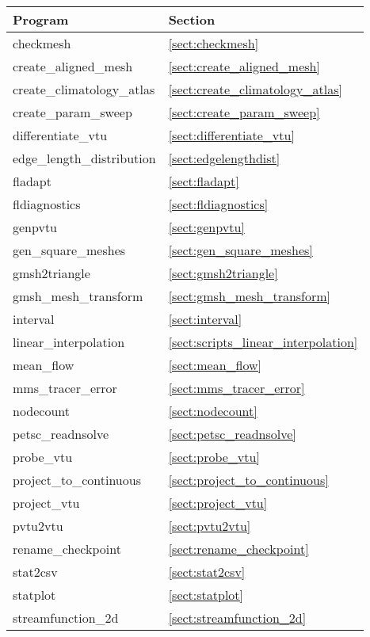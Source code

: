 \begin{table}
\begin{center}
  \begin{tabular}{| l | l |}
    \hline
	Program					& Section 				\\
    \hline
	checkmesh				& \ref{sect:checkmesh}			\\
	create\_aligned\_mesh 			& \ref{sect:create_aligned_mesh}	\\
	create\_climatology\_atlas		& \ref{sect:create_climatology_atlas}	\\
    create\_param\_sweep            & \ref{sect:create_param_sweep} \\
	differentiate\_vtu          		& \ref{sect:differentiate_vtu}		\\
	edge\_length\_distribution		& \ref{sect:edgelengthdist} 		\\
	fladapt					& \ref{sect:fladapt}			\\
	fldiagnostics				& \ref{sect:fldiagnostics}		\\
	genpvtu					& \ref{sect:genpvtu}			\\
	gen\_square\_meshes			& \ref{sect:gen_square_meshes} 		\\
	gmsh2triangle				& \ref{sect:gmsh2triangle}		\\
	gmsh\_mesh\_transform			& \ref{sect:gmsh_mesh_transform}	\\
	interval				& \ref{sect:interval} 			\\
	linear\_interpolation			& \ref{sect:scripts_linear_interpolation} \\	
	mean\_flow				& \ref{sect:mean_flow}			\\
	mms\_tracer\_error			& \ref{sect:mms_tracer_error}		\\
	nodecount				& \ref{sect:nodecount}			\\
	petsc\_readnsolve			& \ref{sect:petsc_readnsolve} 		\\
	probe\_vtu  				& \ref{sect:probe_vtu} 			\\
	project\_to\_continuous			& \ref{sect:project_to_continuous} 	\\
	project\_vtu				& \ref{sect:project_vtu} 		\\
	pvtu2vtu				& \ref{sect:pvtu2vtu}			\\
	rename\_checkpoint			& \ref{sect:rename_checkpoint}		\\
	stat2csv				& \ref{sect:stat2csv}			\\
	statplot				& \ref{sect:statplot} 			\\
	streamfunction\_2d			& \ref{sect:streamfunction_2d} 		\\

\end{tabular}
\end{center}
\end{table}
